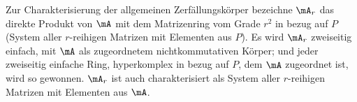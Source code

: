 Zur Charakterisierung der allgemeinen Zerfällungskörper bezeichne $\mA_r$ das direkte Produkt von $\mA$ mit dem Matrizenring vom Grade $r^2$ in bezug auf $P$ (System aller $r$-reihigen Matrizen mit Elementen aus $P$). Es wird $\mA_r$ zweiseitig einfach, mit $\mA$ als zugeordnetem nichtkommutativen Körper; und jeder zweiseitig einfache Ring, hyperkomplex in bezug auf $P$, dem $\mA$ zugeordnet ist, wird so gewonnen. $\mA_r$ ist auch charakterisiert als System aller $r$-reihigen Matrizen mit Elementen aus $\mA$.

